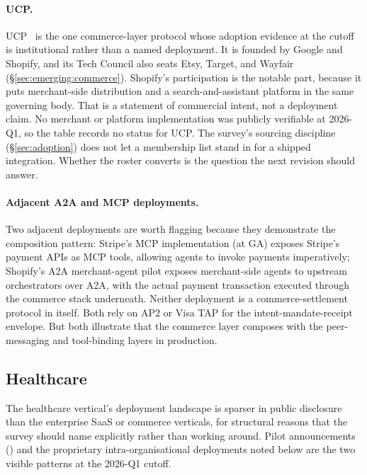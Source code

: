 \paragraph{UCP.}
UCP~\cite{spec_ucp} is the one commerce-layer protocol whose
adoption evidence at the cutoff is institutional rather than a
named deployment. It is founded by Google and Shopify, and its
Tech Council also seats Etsy, Target, and Wayfair
(\S\ref{sec:emerging:commerce}). Shopify's participation is
the notable part, because it puts merchant-side distribution
and a search-and-assistant platform in the same governing
body. That is a statement of commercial intent, not a
deployment claim. No merchant or platform implementation was
publicly verifiable at 2026-Q1, so the table records no status
for UCP. The survey's sourcing discipline
(\S\ref{sec:adoption}) does not let a membership list stand in
for a shipped integration. Whether the roster converts is the
question the next revision should answer.

\paragraph{Adjacent A2A and MCP deployments.}
Two adjacent deployments are worth flagging because they
demonstrate the composition pattern: Stripe's MCP
implementation (at GA) exposes Stripe's payment APIs as
MCP tools, allowing agents to invoke payments
imperatively; Shopify's A2A merchant-agent pilot exposes
merchant-side agents to upstream orchestrators over
A2A, with the actual payment transaction executed
through the commerce stack underneath. Neither
deployment is a commerce-settlement protocol in itself.
Both rely on AP2 or Visa TAP for the
intent-mandate-receipt envelope. But both illustrate
that the commerce layer composes with the peer-messaging
and tool-binding layers in production.

\subsection{Healthcare}
\label{sec:adoption:healthcare}

The healthcare vertical's deployment landscape is
sparser in public disclosure than the enterprise SaaS
or commerce verticals, for structural reasons that
the survey should name explicitly rather than working
around. Pilot announcements
(\cite{vendor_announcements_2026}) and the proprietary
intra-organisational deployments noted below are the
two visible patterns at the 2026-Q1 cutoff.


